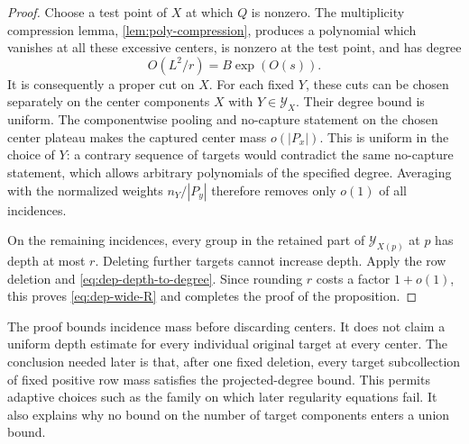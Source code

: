 \begin{proof}
Choose a test point of $X$ at which $Q$ is nonzero. The multiplicity compression lemma, \cref{lem:poly-compression}, produces a polynomial which vanishes at all these excessive centers, is nonzero at the test point, and has degree
\[
 O(L^2/r)=B\exp(O(s)).
\]
It is consequently a proper cut on $X$. For each fixed $Y$, these cuts can be chosen separately on the center components $X$ with $Y\in\mathcal{Y}_X$. Their degree bound is uniform. The componentwise pooling and no-capture statement on the chosen center plateau makes the captured center mass $o(|P_x|)$. This is uniform in the choice of $Y$: a contrary sequence of targets would contradict the same no-capture statement, which allows arbitrary polynomials of the specified degree. Averaging with the normalized weights $n_Y/|P_y|$ therefore removes only $o(1)$ of all incidences.

On the remaining incidences, every group in the retained part of $\mathcal{Y}_{X(p)}$ at $p$ has depth at most $r$. Deleting further targets cannot increase depth. Apply the row deletion and \eqref{eq:dep-depth-to-degree}. Since rounding $r$ costs a factor $1+o(1)$, this proves \eqref{eq:dep-wide-R} and completes the proof of the proposition.
\end{proof}

\begin{remark}\label{rem:dep-uniformity-remark}
The proof bounds incidence mass before discarding centers. It does not claim a uniform depth estimate for every individual original target at every center. The conclusion needed later is that, after one fixed deletion, every target subcollection of fixed positive row mass satisfies the projected-degree bound. This permits adaptive choices such as the family on which later regularity equations fail. It also explains why no bound on the number of target components enters a union bound.
\end{remark}

